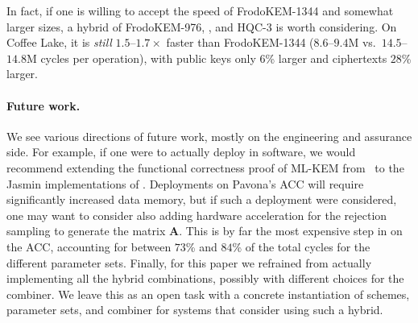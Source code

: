 In fact, if one is willing to accept the speed of FrodoKEM-1344 and somewhat larger sizes, a hybrid
of FrodoKEM-976, , and HQC-3 is worth considering. On Coffee Lake,
it is \emph{still} $1.5$--$1.7\times$ faster than FrodoKEM-1344 ($8.6$--$9.4$M
vs.\ $14.5$--$14.8$M cycles per operation), with public keys only $6$\% larger 
and ciphertexts $28$\% larger.

\paragraph{Future work.}
We see various directions of future work, mostly on the engineering and
assurance side. For example, if one were to actually deploy \kaiburr in
software, we would recommend extending the functional correctness proof
of ML-KEM from~\cite{TCHES:ABBGLL23,C:AOBBDG24,SP:AABBEH25} to the 
Jasmin implementations of \kaiburr. Deployments on Pavona's ACC will
require significantly increased data memory, but if such a deployment
were considered, one may want to consider also adding hardware acceleration
for the rejection sampling to generate the matrix $\mathbf{A}$. This
is by far the most expensive step in \kaiburr on the ACC,
accounting for between $73$\% and $84$\% of the total cycles for the different parameter sets. 
Finally, for this paper we refrained from actually implementing all the hybrid combinations, 
possibly with different choices for the combiner. We leave this as an open
task with a concrete instantiation of schemes, parameter sets, and combiner
for systems that consider using such a hybrid.


